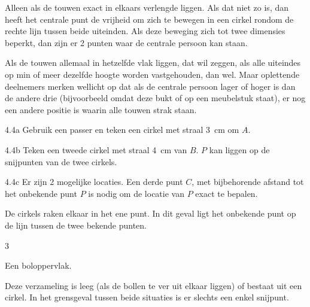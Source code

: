 \begin{Antwoord}{4.2}
		Alleen als de touwen exact in elkaars verlengde liggen. Als dat niet zo is, dan heeft het centrale punt de vrijheid om zich te bewegen in een cirkel rondom de rechte lijn tussen beide uiteinden. Als deze beweging zich tot twee dimensies beperkt, dan zijn er 2 punten waar de centrale persoon kan staan.
	
\end{Antwoord}
\begin{Antwoord}{4.3}
		Als de touwen allemaal in hetzelfde vlak liggen, dat wil zeggen, als alle uiteindes op min of meer dezelfde hoogte worden 	vastgehouden, dan wel. Maar oplettende deelnemers merken wellicht op dat als de centrale persoon lager of hoger is dan de 			andere drie (bijvoorbeeld omdat deze bukt of op een meubelstuk staat), er nog een andere positie is waarin alle touwen 				strak staan.
	
\end{Antwoord}
\begin{Antwoord}{4.4a}
			Gebruik een passer en teken een cirkel met straal 3~cm om $A$.
		
\end{Antwoord}
\begin{Antwoord}{4.4b}
			Teken een tweede cirkel met straal 4~cm van $B$. $P$ kan liggen op de snijpunten van de twee cirkels.
		
\end{Antwoord}
\begin{Antwoord}{4.4c}
			Er zijn 2 mogelijke locaties. Een derde punt $C$, met bijbehorende afstand tot het onbekende punt $P$ is nodig om de locatie van $P$ exact te bepalen.
		
\end{Antwoord}
\begin{Antwoord}{4.5}
		De cirkels raken elkaar in het ene punt. In dit geval ligt het onbekende punt op de lijn tussen de twee bekende punten.
	
\end{Antwoord}
\begin{Antwoord}{4.6}
		3
	
\end{Antwoord}
\begin{Antwoord}{4.7}
		Een boloppervlak.
	
\end{Antwoord}
\begin{Antwoord}{4.8}
			Deze verzameling is leeg (als de bollen te ver uit elkaar liggen) of bestaat uit een cirkel. In het grensgeval tussen beide situaties is er slechts een enkel snijpunt.
		
\end{Antwoord}
